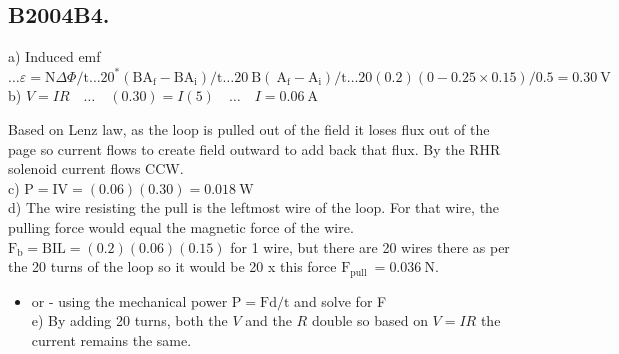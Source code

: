 \begin{enumerate}
\section*{B2004B4.}
a) Induced emf $\ldots \varepsilon=\mathrm{N} \Delta \Phi / \mathrm{t} \ldots 20^{*}\left(\mathrm{BA}_{\mathrm{f}}-\mathrm{BA}_{\mathrm{i}}\right) / \mathrm{t} \ldots 20 \mathrm{~B}\left(\mathrm{~A}_{\mathrm{f}}-\mathrm{A}_{\mathrm{i}}\right) / \mathrm{t} \ldots 20(0.2)(0-0.25 \times 0.15) / 0.5=0.30 \mathrm{~V}$\\
b) $V=I R \quad \ldots \quad(0.30)=I(5) \quad \ldots \quad I=0.06 \mathrm{~A}$

Based on Lenz law, as the loop is pulled out of the field it loses flux out of the page so current flows to create field outward to add back that flux. By the RHR solenoid current flows CCW.\\
c) $\mathrm{P}=\mathrm{IV}=(0.06)(0.30)=0.018 \mathrm{~W}$\\
d) The wire resisting the pull is the leftmost wire of the loop. For that wire, the pulling force would equal the magnetic force of the wire. $\mathrm{F}_{\mathrm{b}}=\mathrm{BIL}=(0.2)(0.06)(0.15)$ for 1 wire, but there are 20 wires there as per the 20 turns of the loop so it would be 20 x this force $\mathrm{F}_{\text {pull }}=0.036 \mathrm{~N}$.

\begin{itemize}
  \item or - using the mechanical power $\mathrm{P}=\mathrm{Fd} / \mathrm{t}$ and solve for F\\
e) By adding 20 turns, both the $V$ and the $R$ double so based on $V=I R$ the current remains the same.
\end{itemize}


\end{enumerate}
